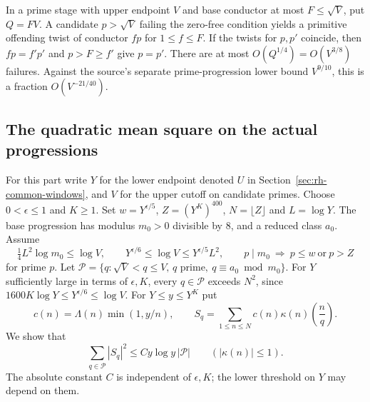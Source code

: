 In a prime stage with upper endpoint \(V\) and base conductor
at most \(F\le\sqrt V\), put \(Q=FV\). A candidate \(p>\sqrt V\)
failing the zero-free condition yields a primitive offending twist
of conductor \(fp\) for \(1\le f\le F\). If the twists for \(p,p'\)
coincide, then \(fp=f'p'\) and \(p>F\ge f'\) give \(p=p'\).
There are at most \(O(Q^{1/4})=O(V^{3/8})\) failures. Against the
source's separate prime-progression lower bound \(V^{9/10}\), this
is a fraction \(O(V^{-21/40})\).

\subsection{The quadratic mean square on the actual progressions}

For this part write \(Y\) for the lower endpoint denoted \(U\) in
Section~\ref{sec:rh-common-windows}, and \(V\) for the upper cutoff
on candidate primes. Choose \(0<\epsilon\le1\) and \(K\ge1\).
Set \(w=Y^{\epsilon/5}\), \(Z=(Y^K)^{400}\), \(N=\lfloor Z\rfloor\)
and \(L=\log Y\). The base progression has modulus \(m_0>0\)
divisible by \(8\), and a reduced class \(a_0\). Assume
\[
 \tfrac14 L^2\log m_0\le\log V,\qquad
 Y^{\epsilon/6}\le\log V\le Y^{\epsilon/5}L^2,\qquad
 p\mid m_0\ \Longrightarrow\ p\le w\ \text{or}\ p>Z
\]
for prime \(p\). Let \(\mathcal P=\{q:\sqrt V<q\le V,\,
q\text{ prime},\ q\equiv a_0\bmod m_0\}\).
For \(Y\) sufficiently large in terms of \(\epsilon,K\),
every \(q\in\mathcal P\) exceeds \(N^2\), since
\(1600K\log Y\le Y^{\epsilon/6}\le\log V\).
For \(Y\le y\le Y^K\) put
\[
 c(n)=\Lambda(n)\min(1,y/n),\qquad
 S_q=\sum_{1\le n\le N} c(n)\kappa(n)\left(\frac{n}{q}\right).
\]
We show that
\begin{equation}
 \sum_{q\in\mathcal P}|S_q|^2\le C y\log y\,|\mathcal P|
 \qquad (|\kappa(n)|\le1).
 \label{eq:window-progress-variance}
\end{equation}
The absolute constant \(C\) is independent of \(\epsilon,K\);
the lower threshold on \(Y\) may depend on them.

